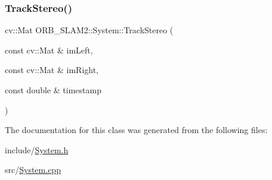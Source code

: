 \subsubsection{\texorpdfstring{Track\+Stereo()}{TrackStereo()}}
{\footnotesize\ttfamily cv\+::\+Mat O\+R\+B\+\_\+\+S\+L\+A\+M2\+::\+System\+::\+Track\+Stereo (\begin{DoxyParamCaption}\item[{const cv\+::\+Mat \&}]{im\+Left,  }\item[{const cv\+::\+Mat \&}]{im\+Right,  }\item[{const double \&}]{timestamp }\end{DoxyParamCaption})}



The documentation for this class was generated from the following files\+:\begin{DoxyCompactItemize}
\item 
include/\mbox{\hyperlink{_system_8h}{System.\+h}}\item 
src/\mbox{\hyperlink{_system_8cpp}{System.\+cpp}}\end{DoxyCompactItemize}
